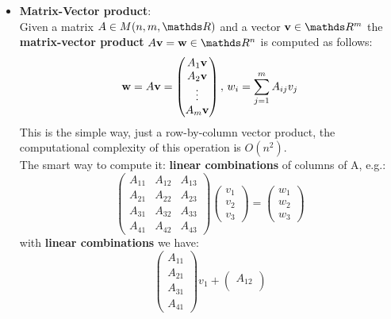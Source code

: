 \documentclass[computationalMathematics.tex]{subfiles}
\begin{document}
\begin{itemize}
     \item \textbf{Matrix-Vector product}:\\
        Given a matrix $A \in M(n, m, \R)$ and a vector $\vect{v} \in \R^m$ the \textbf{matrix-vector product} $A \vect{v} = \vect{w} \in \R^n$ is computed as follows:
        \[
          {\bf w } = A{\bf v } = \begin{pmatrix}
          A_1 {\bf v }\\
          A_2 {\bf v }\\
          \vdots\\
          A_m {\bf v }\\
          \end{pmatrix}, \, 
          w_i = \sum\limits_{j=1}^m A_{ij} v_j
        \]
        This is the simple way, just a row-by-column vector product, the computational complexity of this operation is $O(n^2)$.\\
        The smart way to compute it: \textbf{linear combinations} of columns of A, e.g.:
        \[
            \begin{pmatrix}
                      A_{11} & A_{12} & A_{13}\\
                      A_{21} & A_{22} & A_{23}\\
                      A_{31} & A_{32} & A_{33}\\
                      A_{41} & A_{42} & A_{43}
            \end{pmatrix}
            \begin{pmatrix}
                      v_1\\
                      v_2\\
                      v_3
            \end{pmatrix} =
            \begin{pmatrix}
                      w_1\\
                      w_2\\
                      w_3
            \end{pmatrix}
          \]
        with \textbf{linear combinations} we have:
        \[
        \begin{pmatrix}
                A_{11}\\
                A_{21}\\
                A_{31}\\
                A_{41}
        \end{pmatrix}v_1 +
        \begin{pmatrix}
                A_{12}\\

\end{pmatrix}\]
\end{itemize}
\end{document}

